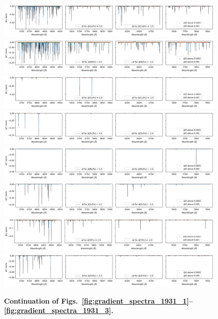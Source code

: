 \documentclass[
  journal=pasa,
  manuscript=research-paper, %
  year=2021,
  volume=37,
]{cup-journal}
\begin{document}
\begin{figure}[hbt!]
 \centering  
 \includegraphics[width=\textwidth]{figures/gradient_spectrum_1931_co_fe.png}
 \includegraphics[width=\textwidth]{figures/gradient_spectrum_1931_ni_fe.png}
 \includegraphics[width=\textwidth]{figures/gradient_spectrum_1931_cu_fe.png}
 \includegraphics[width=\textwidth]{figures/gradient_spectrum_1931_zn_fe.png}
 \includegraphics[width=\textwidth]{figures/gradient_spectrum_1931_rb_fe.png}
 \includegraphics[width=\textwidth]{figures/gradient_spectrum_1931_sr_fe.png}
 \includegraphics[width=\textwidth]{figures/gradient_spectrum_1931_y_fe.png}
 \includegraphics[width=\textwidth]{figures/gradient_spectrum_1931_zr_fe.png}
 \caption{\textbf{Continuation of Figs.~\ref{fig:gradient_spectra_1931_1}--\ref{fig:gradient_spectra_1931_3}.}} \label{fig:gradient_spectra_1931_4}
\end{figure}
\end{document}
